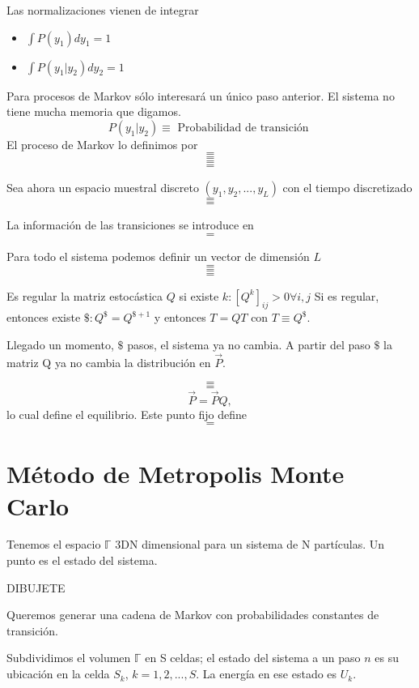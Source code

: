 \documentclass[10pt,oneside]{CBFT_book}
\begin{document}
Las normalizaciones vienen de integrar
\begin{itemize}
 \item $ \int P(y_1) dy_1 = 1 $
 \item $ \int P(y_1|y_2) dy_2 = 1 $
\end{itemize}

Para procesos de Markov sólo interesará un único paso anterior. El sistema no tiene mucha memoria que 
digamos.
\[
	P(y_1|y_2) \equiv \text{ Probabilidad de transición }
\]
El proceso de Markov lo definimos por 
\[=\]
\[=\]
\[=\]
\[=\]

Sea ahora un espacio muestral discreto $(y_1,y_2,...,y_L)$ con el tiempo discretizado
\[=\]
\[=\]

La información de las transiciones se introduce en 
\[=\]

Para todo el sistema podemos definir un vector de dimensión $L$
\[=\]
\[=\]
\[=\]

Es regular la matriz estocástica $ Q $ si existe $ k : [ Q^k ]_{ij} > 0 \forall i,j $
Si es regular, entonces existe $ \$ : Q^\$ =  Q^{\$+1} $ y entonces $T = QT$ con $T\equiv Q^\$$.

Llegado un momento, $\$$ pasos, el sistema ya no cambia. A partir del paso $\$$ la matriz Q ya no cambia
la distribución en $\vec{P}$.


\[=\]
\[=\]
\[
	\vec{P} = \vec{P} Q,
\]
lo cual define el equilibrio. Este punto fijo define
\[ =\]

\section{Método de Metropolis Monte Carlo}

Tenemos el espacio $ \mathbb{\Gamma} $ 3DN dimensional para un sistema de N partículas.
Un punto es el estado del sistema.

DIBUJETE

Queremos generar una cadena de Markov con probabilidades constantes de transición.

Subdividimos el volumen $ \mathbb{\Gamma} $  en S celdas; el estado del sistema a un paso $n$ es su
ubicación en la celda $S_k$, $k=1,2,...,S$. La energía en ese estado es $U_k$.
\end{document}
